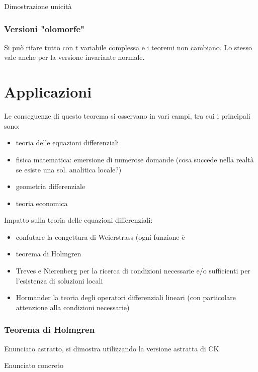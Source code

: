 \documentclass[serif,notheorems]{beamer}
\theoremstyle{definition} %
\theoremstyle{remark}
\begin{document}
\begin{frame}
Dimostrazione unicità
\end{frame}

\begin{frame}
\frametitle{Versioni "olomorfe"}
Si può rifare tutto con $t$ variabile complessa e i teoremi non cambiano. Lo stesso vale anche per la versione invariante normale.
\end{frame}




\section{Applicazioni}

\begin{frame}
Le conseguenze di questo teorema si osservano in vari campi, tra cui i principali sono:
\begin{itemize}
\item teoria delle equazioni differenziali
\item fisica matematica: emersione di numerose domande (cosa succede nella realtà se esiste una sol. analitica locale?)
\item geometria differenziale
\item teoria economica
\end{itemize}
\end{frame}

\begin{frame}
Impatto sulla teoria delle equazioni differenziali:
\begin{itemize}
\item confutare la congettura di Weierstrass (ogni funzione è 
\item teorema di Holmgren
\item Treves e Nierenberg per la ricerca di condizioni necessarie e/o sufficienti per l'esistenza di soluzioni locali
\item Hormander la teoria degli operatori differenziali lineari (con particolare attenzione alla condizioni necessarie)
\end{itemize}
\end{frame}

\begin{frame}
\frametitle{Teorema di Holmgren}
Enunciato astratto, si dimostra utilizzando la versione astratta di CK
\end{frame}


\begin{frame}
Enunciato concreto
\end{frame}
\end{document}
